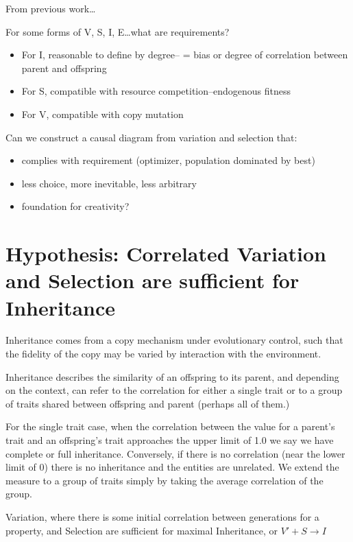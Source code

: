 From previous work\ldots{}

For some forms of V, S, I, E\ldots{}what are requirements?

\begin{itemize}
	\item
 For I, reasonable to define by degree--\autocite{Bourrat2015} = bias
 or degree of correlation between parent and offspring
	\item
 For S, compatible with resource competition--endogenous fitness
	\item
 For V, compatible with copy mutation
\end{itemize}

Can we construct a causal diagram from variation and selection that:

\begin{itemize}
	\item
 complies with requirement (optimizer, population dominated by best)
	\item
 less choice, more inevitable, less arbitrary
	\item
 foundation for creativity?
\end{itemize}

\section{Hypothesis: Correlated Variation and Selection are sufficient for Inheritance}\label{h2}

Inheritance comes from a copy mechanism under evolutionary control, such that the fidelity of the copy may
be varied by interaction with the environment.

Inheritance describes the similarity of an offspring to its parent, and depending on the context, can refer to the correlation for either a single trait or to a group of traits shared between offspring and parent (perhaps all of them.)

For the single trait case, when the correlation between the value for a parent's trait and an offspring's trait approaches the upper limit of 1.0 we say we have complete or full inheritance. Conversely, if there is no correlation (near the lower limit of 0) there is no inheritance and the entities are unrelated. We extend the measure to a group of traits simply by taking the average correlation of the group.

\begin{hypothesis}
	Variation, where there is some initial correlation between generations for a property, and Selection are sufficient for maximal Inheritance, or $V'+S\rightarrow I$
\end{hypothesis}\label{hypothesis-2}

